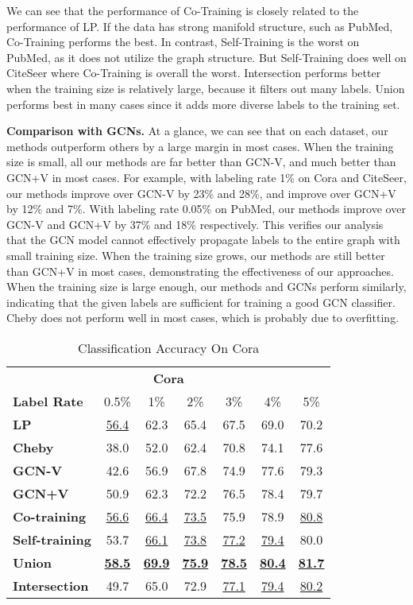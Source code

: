 \documentclass[letterpaper]{article} \usepackage{aaai18}  \usepackage{times}  \usepackage{helvet}  \usepackage{courier}  \usepackage{url}  \usepackage{graphicx}  \usepackage{algorithm}
\begin{document}
We can see that the performance of Co-Training is closely related to the performance of LP. If the data has strong manifold structure, such as PubMed, Co-Training performs the best. In contrast, Self-Training is the worst on PubMed, as it does not utilize the graph structure. But Self-Training does well on CiteSeer where Co-Training is overall the worst. Intersection performs better when the training size is relatively large, because it filters out many labels. Union performs best in many cases since it adds more diverse labels to the training set.

\textbf{Comparison with GCNs.}
At a glance, we can see that on each dataset, our methods outperform others by a large margin in most cases. When the training size is small, all our methods are far better than GCN-V, and much better than GCN+V in most cases. For example, with labeling rate 1\% on Cora and CiteSeer, our methods improve over GCN-V by 23\% and 28\%, and improve over GCN+V by 12\% and 7\%. With labeling rate 0.05\% on PubMed, our methods improve over GCN-V and GCN+V by 37\% and 18\% respectively. This verifies our analysis that the GCN model cannot effectively propagate labels to the entire graph with small training size. When the training size grows, our methods are still better than GCN+V in most cases, demonstrating the effectiveness of our approaches. When the training size is large enough, our methods and GCNs perform similarly, indicating that the given labels are sufficient for training a good GCN classifier. Cheby does not perform well in most cases, which is probably due to overfitting.


\begin{table}[t]
\centering
\small
\caption{Classification Accuracy On Cora}\label{tab:cora}
\begin{tabular}{l cccccc}
    \multicolumn{7}{c}{ \normalsize \textbf{Cora}} \\
\textbf{Label Rate} & 0.5\% & 1\% & 2\% & 3\% & 4\% & 5\% \\
    \midrule
    \textbf{LP}             & \underline{56.4} & 62.3 & 65.4 & 67.5 & 69.0 & 70.2 \\
\textbf{Cheby}          & 38.0 & 52.0 & 62.4 & 70.8 & 74.1 & 77.6 \\
    \textbf{GCN-V}          & 42.6 & 56.9 & 67.8 & 74.9 & 77.6 & 79.3 \\
    \textbf{GCN+V}          & 50.9 & 62.3 & 72.2 & 76.5 & 78.4 & 79.7 \\
    \midrule
    \textbf{Co-training}    & \underline{56.6} & \underline{66.4} & \underline{73.5} & 75.9 & 78.9 & \underline{80.8} \\
    \textbf{Self-training}  & 53.7 & \underline{66.1} & \underline{73.8} & \underline{77.2} & \underline{79.4} & 80.0 \\
    \textbf{Union}          & \underline{\textbf{58.5}} & \underline{\textbf{69.9}} & \underline{\textbf{75.9}} & \underline{\textbf{78.5}} & \underline{\textbf{80.4}} & \underline{\textbf{81.7}} \\
    \textbf{Intersection}   & 49.7 & 65.0 & 72.9 & \underline{77.1} & \underline{79.4} & \underline{80.2} \\
\end{tabular}
\end{table}
\end{document}
